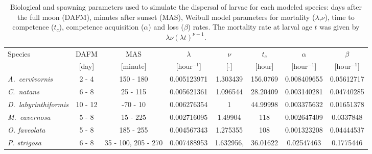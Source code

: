 \documentclass[preprint,12pt,authoryear]{elsarticle}
\begin{document}
\begin{table}
    \begin{adjustwidth}{-1in}{-1in}
    \centering
    \scriptsize
    \begin{tabular}{lccccccc}
        \hline
        Species & DAFM  & MAS      &  $\lambda$     & $\nu$ & $t_c$  & $\alpha$      & $\beta$ \\
                & [day] & [minute] &  [hour$^{-1}$] & [-]   & [hour] & [hour$^{-1}$] & [hour$^{-1}$] \\
        \hline
        \textit{A.~cervivornis} & 2 - 4 & 150 - 180 & 0.005123971 & 1.303439 & 156.0769 & 0.008409655 & 0.05612717 \\
        \textit{C.~natans}      & 6 - 8 & 25 - 115  &  0.005621361 & 1.096544 & 28.20409 & 0.003140281 & 0.04740285 \\
        \textit{D.~labyrinthiformis} & 10 - 12 & -70 - 10 & 0.006276354 & 1 &  44.99998 & 0.003375632 & 0.01651378 \\
        \textit{M.~cavernosa}   & 5 - 8 & 15 - 225 & 0.002716095 & 1.49904 & 118 & 0.002647409 & 0.0337848 \\
        \textit{O. faveolata}   & 5 - 8 & 185 - 255 &  0.004567343 & 1.275355 & 108 & 0.001323208 & 0.04444537 \\
        \textit{P. strigosa}    & 6 - 8 &  35 - 100, 205 - 270 & 0.007488953 & 1.632956, & 36.01622 & 0.02547463 & 0.1775446 \\
        \hline
    \end{tabular}
    \end{adjustwidth}
    \caption{Biological and spawning parameters used to simulate the dispersal of larvae for each modeled species: days after the full moon (DAFM), minutes after sunset (MAS), Weibull model parameters for mortality ($\lambda$,$\nu$), time to competence ($t_c$), competence acquisition ($\alpha$) and loss ($\beta$) rates. The mortality rate at larval age $t$ was given by $\lambda\nu(\lambda t)^{\nu-1}$.}\label{tab:species}
\end{table}
\end{document}
